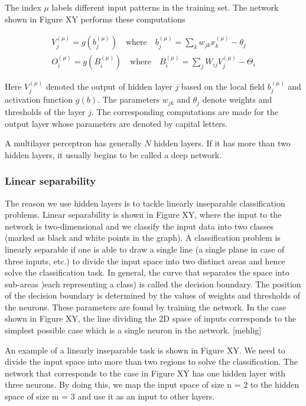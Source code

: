 The index $ \mu $ labels different input patterns in the training set. The network shown in Figure XY performs these computations

\begin{gather}
V_j^{(\mu)} = g(b_j^{(\mu)}) \quad \text{where} \quad b_j^{(\mu)} = \sum_{k} w_{jk} x_{k}^{(\mu)} - \theta_{j} \\
O_i^{(\mu)} = g(B_i^{(\mu)}) \quad \text{where} \quad B_i^{(\mu)} = \sum_{j} W_{ij} V_{j}^{(\mu)} - \Theta_{i} 
\end{gather}

Here $ V_j^{(\mu)} $ denoted the output of hidden layer $ j $ based on the local field $ b_j^{(\mu)} $ and activation function $ g(b) $. The parameters $ w_{jk} $ and $ \theta_{j} $ denote weights and thresholds of the layer $ j $. The corresponding computations are made for the output layer whose parameters are denoted by capital letters. 

A multilayer perceptron has generally $ N $ hidden layers. If it has more than two hidden layers, it usually begins to be called a deep network. 

\subsubsection{Linear separability}

The reason we use hidden layers is to tackle linearly inseparable classification problems. Linear separability is shown in Figure XY, where the input to the network is two-dimensional and we classify the input data into two classes (marked as black and white points in the graph). A classification problem is linearly separable if one is able to draw a single line (a single plane in case of three inputs, etc.) to divide the input space into two distinct areas and hence solve the classification task. In general, the curve that separates the space into sub-areas )each representing a class) is called the decision boundary. The position of the decision boundary is determined by the values of weights and thresholds of the neurons. These parameters are found by training the network. In the case shown in Figure XY, the line dividing the 2D space of inputs corresponds to the simplest possible case which is a single neuron in the network. [mehlig]

An example of a linearly inseparable task is shown in Figure XY. We need to divide the input space into more than two regions to solve the classification. The network that corresponds to the case in Figure XY has one hidden layer with three neurons. By doing this, we map the input space of size n = 2 to the hidden space of size m = 3 and use it as an input to other layers.

